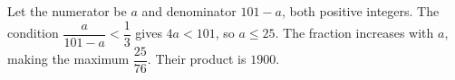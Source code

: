 Let the numerator be $a$ and denominator $101-a$, both positive integers. The condition $\dfrac{a}{101-a}<\dfrac{1}{3}$ gives $4a<101$, so $a\le25$. The fraction increases with $a$, making the maximum $\dfrac{25}{76}$. Their product is $\boxed{1900}$.
